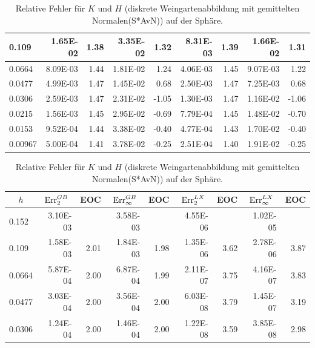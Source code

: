 \begin{table}[htbp]
\begin{tabular}{|l|r|r|r|r|r|r|r|r|}
            0.109 & 1.65E-02 & 1.38 & 3.35E-02 & 1.32 & 8.31E-03 & 1.39 & 1.66E-02 & 1.31 \\ \hline
            0.0664 & 8.09E-03 & 1.44 & 1.81E-02 & 1.24 & 4.06E-03 & 1.45 & 9.07E-03 & 1.22 \\ \hline
            0.0477 & 4.99E-03 & 1.47 & 1.45E-02 & 0.68 & 2.50E-03 & 1.47 & 7.25E-03 & 0.68 \\ \hline
            0.0306 & 2.59E-03 & 1.47 & 2.31E-02 & -1.05 & 1.30E-03 & 1.47 & 1.16E-02 & -1.06 \\ \hline
            0.0215 & 1.56E-03 & 1.45 & 2.95E-02 & -0.69 & 7.79E-04 & 1.45 & 1.48E-02 & -0.70 \\ \hline
            0.0153 & 9.52E-04 & 1.44 & 3.38E-02 & -0.40 & 4.77E-04 & 1.43 & 1.70E-02 & -0.40 \\ \hline
            0.00967 & 5.00E-04 & 1.41 & 3.78E-02 & -0.25 & 2.51E-04 & 1.40 & 1.91E-02 & -0.25 \\ \hline
      \end{tabular}
      \caption[Weingarten auf der Sphäre (S*AvN)]{Relative Fehler für \( K \) und \( H \) (diskrete Weingartenabbildung mit gemittelten Normalen(S*AvN)) auf der Sphäre.}
      \label{tabSphereWeingartenAvN}
      \vspace{10pt}
    \centering
      \begin{tabular}{|l|r|r|r|r|r|r|r|r|}
      \hline
      \multicolumn{1}{|c|}{\rule{0pt}{11pt}\( h \)} & \multicolumn{1}{c|}{\( \text{Err}_{2}^{GB} \)} & \multicolumn{1}{c|}{EOC} & 
           \multicolumn{1}{c|}{\( \text{Err}_{\infty}^{GB} \)} & \multicolumn{1}{c|}{EOC} & \multicolumn{1}{c|}{\( \text{Err}_{2}^{LX} \)} &
           \multicolumn{1}{c|}{EOC} & \multicolumn{1}{c|}{\( \text{Err}_{\infty}^{LX} \)} & \multicolumn{1}{c|}{EOC} \\ \hline
           0.152 & 3.10E-03 & \multicolumn{1}{l|}{} & 3.58E-03 & \multicolumn{1}{l|}{} & 4.55E-06 & \multicolumn{1}{l|}{} & 1.02E-05 & \multicolumn{1}{l|}{} \\ \hline
            0.109 & 1.58E-03 & 2.01 & 1.84E-03 & 1.98 & 1.35E-06 & 3.62 & 2.78E-06 & 3.87 \\ \hline
            0.0664 & 5.87E-04 & 2.00 & 6.87E-04 & 1.99 & 2.11E-07 & 3.75 & 4.16E-07 & 3.83 \\ \hline
            0.0477 & 3.03E-04 & 2.00 & 3.56E-04 & 2.00 & 6.03E-08 & 3.79 & 1.45E-07 & 3.19 \\ \hline
            0.0306 & 1.24E-04 & 2.00 & 1.46E-04 & 2.00 & 1.22E-08 & 3.59 & 3.85E-08 & 2.98 \\ \hline

\end{tabular}
\end{table}
